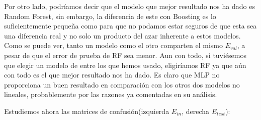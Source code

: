 \documentclass{article}
\begin{document}
	\par
	Por otro lado, podríamos decir que el modelo que mejor resultado nos ha dado es Random Forest, sin embargo, la diferencia de este con Boosting es lo suficientemente pequeña como para que no podamos estar seguros de que esta sea una diferencia real y no solo un producto del azar inherente a estos modelos. Como se puede ver, tanto un modelo como el otro comparten el mismo $E_{val}$, a pesar de que el error de prueba de RF sea menor. Aun con todo, si tuviésemos que elegir un modelo de entre los que hemos usado, eligiríamos RF ya que aún con todo es el que mejor resultado nos ha dado. Es claro que MLP no proporciona un buen resultado en comparación con los otros dos modelos no lineales, probablemente por las razones ya comentadas en su análisis.
	\par
	Estudiemos ahora las matrices de confusión(izquierda $E_{in}$, derecha ${E_{test}}$):
	
\end{document}

